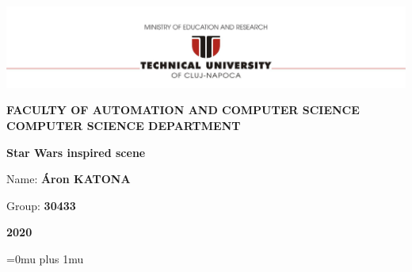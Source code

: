 \documentclass[12pt,a4paper,twoside]{report}
\renewcommand{\thesisauthor}{Áron KATONA}    %
\newcommand{\thesisauthorgroup}{30433}    %
\renewcommand{\thesisyear}{2020}      %
\renewcommand{\thesistitle}{Star Wars inspired scene}
\newcommand{\department}{\bf FACULTY OF AUTOMATION AND COMPUTER SCIENCE\\
COMPUTER SCIENCE DEPARTMENT}
\newcommand{\utcnlogo}{\includegraphics[width=15cm]{img/tucn.jpg}}
\begin{document}

\newenvironment{definition}[1][Defini\c{t}ie.]{\begin{trivlist}
\item[\hskip \labelsep {\bfseries #1}]}{\end{trivlist}}





\begin{center}
\utcnlogo

\department

\vspace{4cm}

{\bf \thesistitle} %

\vspace{1.5cm}


\vspace{6cm}

Name: {\bf \thesisauthor} 

Group: {\bf \thesisauthorgroup}

\vspace{3cm}
{\bf \thesisyear}
\end{center}

\thispagestyle{empty}
\newpage

\setcounter{page}{1}



\tableofcontents
\newpage

\setcounter{page}{1}
\pagestyle{headings}

 






\Urlmuskip=0mu plus 1mu
 
\end{document}
